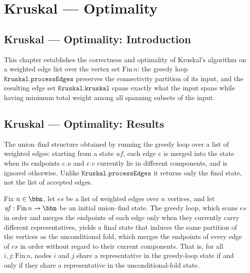 \section{Kruskal --- Optimality}
\subsection*{Kruskal --- Optimality: Introduction}

This chapter establishes the correctness and optimality of Kruskal's algorithm on a
weighted edge list over the vertex set $\mathrm{Fin}\,n$: the greedy loop
$\texttt{Kruskal.processEdges}$ preserves the connectivity partition of its input, and the
resulting edge set $\texttt{Kruskal.kruskal}$ spans exactly what the input spans while
having minimum total weight among all spanning subsets of the input.

\subsection*{Kruskal --- Optimality: Results}

\begin{definition}
\label{Kruskal.ufAfterProcessEdges}
\leanok
{}
The union--find structure obtained by running the greedy loop over a list of weighted
edges: starting from a state $uf$, each edge $e$ is merged into the state when its
endpoints $e.u$ and $e.v$ currently lie in different components, and is ignored
otherwise. Unlike $\texttt{Kruskal.processEdges}$ it returns only the final state, not the
list of accepted edges.
\end{definition}

\begin{lemma}
\label{Kruskal.ufAfterProcessEdges_partition}
\leanok
{}
Fix $n \in \bbn$, let $\mathit{es}$ be a list of weighted edges over $n$ vertices, and
let $\mathit{uf} : \mathrm{Fin}\,n \to \bbn$ be an initial union--find state. The greedy
loop, which scans $\mathit{es}$ in order and merges the endpoints of each edge only when
they currently carry different representatives, yields a final state that induces the
same partition of the vertices as the unconditional fold, which merges the endpoints of
every edge of $\mathit{es}$ in order without regard to their current components. That
is, for all $i, j : \mathrm{Fin}\,n$, nodes $i$ and $j$ share a representative in the
greedy-loop state if and only if they share a representative in the unconditional-fold
state.
\end{lemma}

